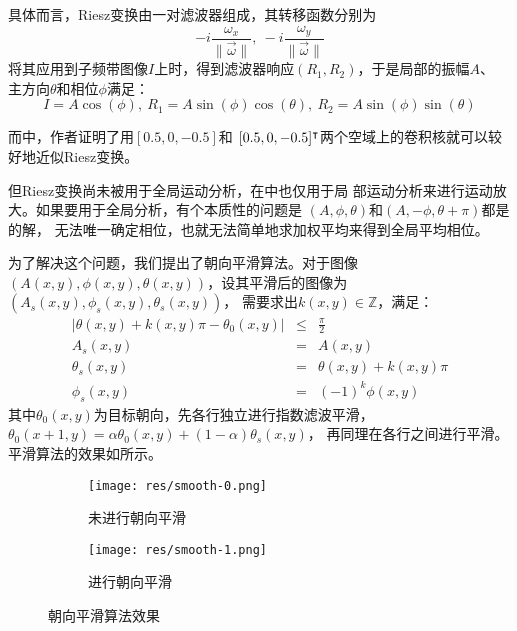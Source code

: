 具体而言，Riesz变换由一对滤波器组成，其转移函数分别为
\begin{equation}
    -i\frac{\omega_x}{\parallel \overrightarrow{ \omega} \parallel},~
    -i\frac{\omega_y}{\parallel \overrightarrow{ \omega} \parallel}
\end{equation}
将其应用到子频带图像$I$上时，得到滤波器响应$(R_1, R_2)$，于是局部的振幅$A$、
主方向$\theta$和相位$\phi$满足：
\begin{equation}
    I = A\cos(\phi),~R_1 = A\sin(\phi)\cos(\theta),~
    R_2 = A\sin(\phi)\sin(\theta)
    \label{eqn:riesz:decomp}
\end{equation}

而\cite{Wadhwa2014RieszPyramid}中，作者证明了用$[0.5,0,-0.5]$和
$[0.5,0,-0.5]^\intercal$两个空域上的卷积核就可以较好地近似Riesz变换。

但Riesz变换尚未被用于全局运动分析，在\cite{Wadhwa2014RieszPyramid}中也仅用于局
部运动分析来进行运动放大。如果要用于全局分析，有个本质性的问题是
$(A, \phi, \theta)$和$(A, -\phi, \theta + \pi)$都是的解，
无法唯一确定相位，也就无法简单地求加权平均来得到全局平均相位。

为了解决这个问题，我们提出了朝向平滑算法。对于图像$(A(x, y), \phi(x, y),
\theta(x, y))$，设其平滑后的图像为$(A_s(x, y), \phi_s(x, y), \theta_s(x, y))$，
需要求出$k(x, y)\in \mathbb{Z}$，满足：
\begin{eqnarray}
    |\theta(x, y) + k(x, y)\pi - \theta_0(x, y)| &\le& \frac{\pi}{2} \nonumber \\
    A_s(x, y) &=& A(x, y) \nonumber \\
    \theta_s(x, y) &=& \theta(x, y) + k(x, y)\pi \nonumber \\
    \phi_s(x, y) &=& (-1)^k\phi(x, y)
\end{eqnarray}
其中$\theta_0(x, y)$为目标朝向，先各行独立进行指数滤波平滑，
$\theta_0(x+1, y) = \alpha\theta_0(x, y) + (1-\alpha)\theta_s(x, y)$，
再同理在各行之间进行平滑。平滑算法的效果如所示。
\begin{figure}[h!]\begin{center}
    \begin{subfigure}[b]{.5\figwidth}
        \centering
        \texttt{[image: res/smooth-0.png]}
        \caption{未进行朝向平滑}
    \end{subfigure}
    \begin{subfigure}[b]{.5\figwidth}
        \centering
        \texttt{[image: res/smooth-1.png]}
        \caption{进行朝向平滑}
    \end{subfigure}
    \caption{朝向平滑算法效果\label{fig:smooth}}
\end{center}\end{figure}

